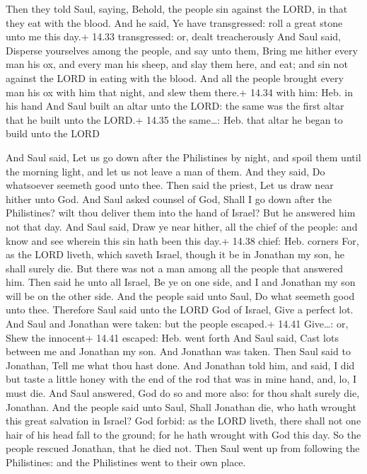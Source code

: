  Then they told Saul, saying, Behold, the people sin
against the LORD, in that they eat with the blood. And he said, Ye have
transgressed: roll a great stone unto me this day.+ 14.33 transgressed:
or, dealt treacherously  And Saul said, Disperse yourselves
among the people, and say unto them, Bring me hither every man his ox,
and every man his sheep, and slay them here, and eat; and sin not
against the LORD in eating with the blood. And all the people brought
every man his ox with him that night, and slew them there.+ 14.34 with
him: Heb. in his hand  And Saul built an altar unto the
LORD: the same was the first altar that he built unto the LORD.+ 14.35
the same\ldots: Heb. that altar he began to build unto the LORD

 And Saul said, Let us go down after the Philistines by
night, and spoil them until the morning light, and let us not leave a
man of them. And they said, Do whatsoever seemeth good unto thee. Then
said the priest, Let us draw near hither unto God.  And
Saul asked counsel of God, Shall I go down after the Philistines? wilt
thou deliver them into the hand of Israel? But he answered him not that
day.  And Saul said, Draw ye near hither, all the chief of
the people: and know and see wherein this sin hath been this day.+ 14.38
chief: Heb. corners  For, as the LORD liveth, which saveth
Israel, though it be in Jonathan my son, he shall surely die. But there
was not a man among all the people that answered him.  Then
said he unto all Israel, Be ye on one side, and I and Jonathan my son
will be on the other side. And the people said unto Saul, Do what
seemeth good unto thee.  Therefore Saul said unto the LORD
God of Israel, Give a perfect lot. And Saul and Jonathan were taken: but
the people escaped.+ 14.41 Give\ldots: or, Shew the innocent+ 14.41
escaped: Heb. went forth  And Saul said, Cast lots between
me and Jonathan my son. And Jonathan was taken.  Then Saul
said to Jonathan, Tell me what thou hast done. And Jonathan told him,
and said, I did but taste a little honey with the end of the rod that
was in mine hand, and, lo, I must die.  And Saul answered,
God do so and more also: for thou shalt surely die, Jonathan.
 And the people said unto Saul, Shall Jonathan die, who
hath wrought this great salvation in Israel? God forbid: as the LORD
liveth, there shall not one hair of his head fall to the ground; for he
hath wrought with God this day. So the people rescued Jonathan, that he
died not.  Then Saul went up from following the
Philistines: and the Philistines went to their own place.


